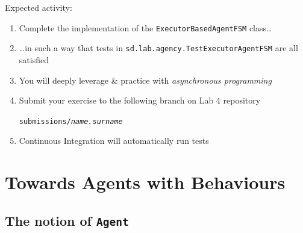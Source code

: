 \documentclass[presentation]{beamer}\mode<presentation>{\usetheme{AMSCesenaPurpleAndGold}}
\newcommand{\labN}{4}
\begin{document}
\begin{frame}[c, allowframebreaks]
    \framebreak

    Expected activity:
    \bigskip
    \begin{enumerate}

        \item Complete the implementation of the \texttt{ExecutorBasedAgentFSM} class\ldots

        \bigskip

        \item \ldots in such a way that tests in \texttt{sd.lab.agency.\alert{TestExecutorAgentFSM}} are all satisfied

        \bigskip

        \item You will deeply leverage \& practice with \emph{asynchronous programming}

        \bigskip

        \item Submit your exercise to the following branch on Lab \labN{} repository
        \begin{center}
            \texttt{submissions/\textit{name.surname}}
        \end{center}

        \bigskip

        \item Continuous Integration will automatically run tests
    \end{enumerate}

\end{frame}

\section{Towards Agents with Behaviours}

\subsection{The notion of \texttt{Agent}}
\end{document}
